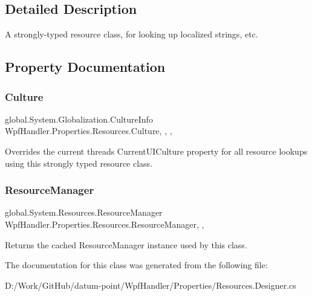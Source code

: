 \subsection{Detailed Description}
A strongly-\/typed resource class, for looking up localized strings, etc. 



\subsection{Property Documentation}
\mbox{\label{class_wpf_handler_1_1_properties_1_1_resources_a9d6eb037cf7891a3ed5b2370e7dfdc23}} 
\subsubsection{\texorpdfstring{Culture}{Culture}}
{\footnotesize\ttfamily global.\+System.\+Globalization.\+Culture\+Info Wpf\+Handler.\+Properties.\+Resources.\+Culture\hspace{0.3cm}{\ttfamily [static]}, {\ttfamily [get]}, {\ttfamily [set]}, {\ttfamily [package]}}



Overrides the current thread\textquotesingle{}s Current\+U\+I\+Culture property for all resource lookups using this strongly typed resource class. 

\mbox{\label{class_wpf_handler_1_1_properties_1_1_resources_a4908c4924066b6d42cc0e042fdae5079}} 
\subsubsection{\texorpdfstring{Resource\+Manager}{ResourceManager}}
{\footnotesize\ttfamily global.\+System.\+Resources.\+Resource\+Manager Wpf\+Handler.\+Properties.\+Resources.\+Resource\+Manager\hspace{0.3cm}{\ttfamily [static]}, {\ttfamily [get]}, {\ttfamily [package]}}



Returns the cached Resource\+Manager instance used by this class. 



The documentation for this class was generated from the following file\+:\begin{DoxyCompactItemize}
\item 
D\+:/\+Work/\+Git\+Hub/datum-\/point/\+Wpf\+Handler/\+Properties/Resources.\+Designer.\+cs\end{DoxyCompactItemize}
